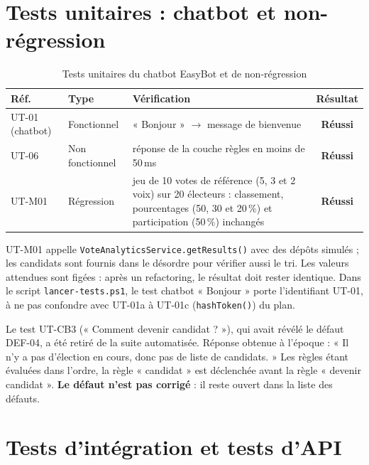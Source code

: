 \documentclass[12pt,a4paper]{report}
\newcommand{\ok}{\textcolor{okgreen}{\textbf{Réussi}}}
\begin{document}
\section{Tests unitaires : chatbot et non-régression}
\begin{table}[H]
\centering
\caption{Tests unitaires du chatbot EasyBot et de non-régression}
\small
\begin{tabularx}{\textwidth}{@{}lp{2.4cm}Xc@{}}
\toprule
\rowcolor{evlight}\textbf{Réf.} & \textbf{Type} & \textbf{Vérification} & \textbf{Résultat}\\
\midrule
UT-01 (chatbot) & Fonctionnel & « Bonjour » $\rightarrow$ message de bienvenue & \ok\\
UT-06 & Non fonctionnel & réponse de la couche règles en moins de 50\,ms & \ok\\
UT-M01 & Régression & jeu de 10 votes de référence (5, 3 et 2 voix) sur 20 électeurs : classement, pourcentages (50, 30 et 20\,\%) et participation (50\,\%) inchangés & \ok\\
\bottomrule
\end{tabularx}
\end{table}
UT-M01 appelle \texttt{VoteAnalyticsService.getResults()} avec des dépôts simulés ; les candidats sont fournis dans le désordre pour vérifier aussi le tri. Les valeurs attendues sont figées : après un refactoring, le résultat doit rester identique. Dans le script \texttt{lancer-tests.ps1}, le test chatbot « Bonjour » porte l'identifiant UT-01, à ne pas confondre avec UT-01a à UT-01c (\texttt{hashToken()}) du plan.

Le test UT-CB3 (« Comment devenir candidat ? »), qui avait révélé le défaut DEF-04, a été retiré de la suite automatisée. Réponse obtenue à l'époque : « Il n'y a pas d'élection en cours, donc pas de liste de candidats. » Les règles étant évaluées dans l'ordre, la règle « candidat » est déclenchée avant la règle « devenir candidat ». \textbf{Le défaut n'est pas corrigé} : il reste ouvert dans la liste des défauts.

\section{Tests d'intégration et tests d'API}
\end{document}
